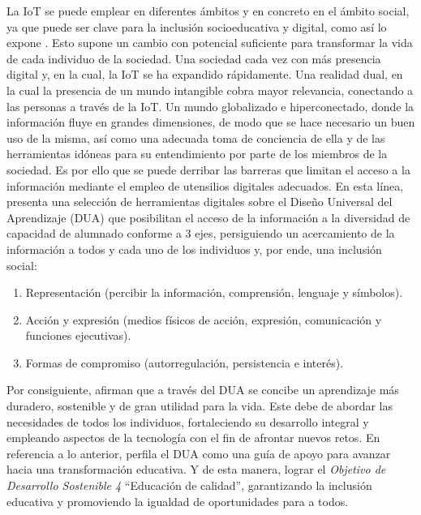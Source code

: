 \documentclass[spanish]{textolivre}
\begin{document}
La IoT se puede emplear en diferentes ámbitos y en concreto en el ámbito social, ya que puede ser clave para la inclusión socioeducativa y digital, como así lo expone \textcite{cpv__incorporando_2020}. Esto supone un cambio con potencial suficiente para transformar la vida de cada individuo de la sociedad. Una sociedad cada vez con más presencia digital y, en la cual, la IoT se ha expandido rápidamente. Una realidad dual, en la cual la presencia de un mundo intangible cobra mayor relevancia, conectando a las personas a través de la IoT. Un mundo globalizado e hiperconectado, donde la información fluye en grandes dimensiones, de modo que se hace necesario un buen uso de la misma, así como una adecuada toma de conciencia de ella y de las herramientas idóneas para su entendimiento por parte de los miembros de la sociedad. Es por ello que se puede derribar las barreras que limitan el acceso a la información mediante el empleo de utensilios digitales adecuados. En esta línea, \textcite{marquez_rueda_2018} presenta una selección de herramientas digitales sobre el Diseño Universal del Aprendizaje (DUA) que posibilitan el acceso de la información a la diversidad de capacidad de alumnado conforme a 3 ejes, persiguiendo un acercamiento de la información a todos y cada uno de los individuos y, por ende, una inclusión social: 

\begin{enumerate}
    \item Representación (percibir la información, comprensión, lenguaje y símbolos).
    \item Acción y expresión (medios físicos de acción, expresión, comunicación y funciones ejecutivas).
    \item Formas de compromiso (autorregulación, persistencia e interés).
\end{enumerate}

Por consiguiente, \textcite{vallejo_estructuras_2019} afirman que a través del DUA se concibe un aprendizaje más duradero, sostenible y de gran utilidad para la vida. Este debe de abordar las necesidades de todos los individuos, fortaleciendo su desarrollo integral y empleando aspectos de la tecnología con el fin de afrontar nuevos retos. En referencia a lo anterior, \textcite{pastor_diseno_2019} perfila el DUA como una guía de apoyo para avanzar hacia una transformación educativa. Y de esta manera, lograr el \textit{Objetivo de Desarrollo Sostenible 4} “Educación de calidad”, garantizando la inclusión educativa y promoviendo la igualdad de oportunidades para a todos.
\end{document}
